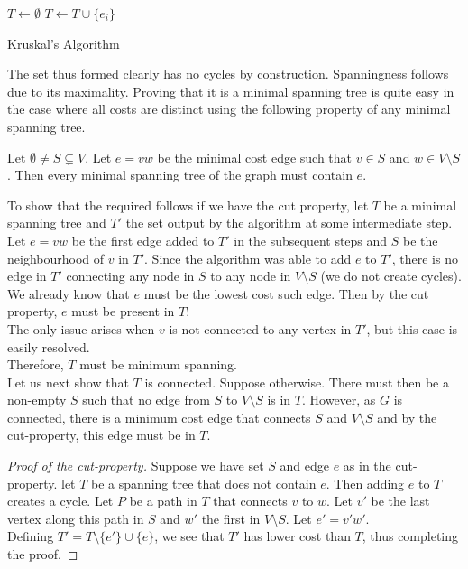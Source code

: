 \begin{algorithm}
	\DontPrintSemicolon
	\SetNoFillComment
	 
	$T\gets\emptyset$\;
	 {
		 {
			$T\gets T\cup\{e_i\}$
		}
	}
	\caption{Kruskal's Algorithm}\label{algo: kruskal's algorithm}
\end{algorithm}

The set thus formed clearly has no cycles by construction. Spanningness follows due to its maximality. Proving that it is a minimal spanning tree is quite easy in the case where all costs are distinct using the following property of any minimal spanning tree.

\begin{lemma}
	Let $\emptyset\neq S\subsetneq V$. Let $e=vw$ be the minimal cost edge such that $v\in S$ and $w\in V\setminus S$. Then every minimal spanning tree of the graph must contain $e$.
\end{lemma}

To show that the required follows if we have the cut property, let $T$ be a minimal spanning tree and $T'$ the set output by the algorithm at some intermediate step.\\
Let $e=vw$ be the first edge added to $T'$ in the subsequent steps and $S$ be the neighbourhood of $v$ in $T'$. Since the algorithm was able to add $e$ to $T'$, there is no edge in $T'$ connecting any node in $S$ to any node in $V\setminus S$ (we do not create cycles). We already know that $e$ must be the lowest cost such edge. Then by the cut property, $e$ must be present in $T$!\\
The only issue arises when $v$ is not connected to any vertex in $T'$, but this case is easily resolved.\\
Therefore, $T$ must be minimum spanning.\\

Let us next show that $T$ is connected. Suppose otherwise. There must then be a non-empty $S$ such that no edge from $S$ to $V\setminus S$ is in $T$. However, as $G$ is connected, there is a minimum cost edge that connects $S$ and $V\setminus S$ and by the cut-property, this edge must be in $T$.

\begin{proof}[Proof of the cut-property]
	Suppose we have set $S$ and edge $e$ as in the cut-property. let $T$ be a spanning tree that does not contain $e$. Then adding $e$ to $T$ creates a cycle. Let $P$ be a path in $T$ that connects $v$ to $w$. Let $v'$ be the last vertex along this path in $S$ and $w'$ the first in $V\setminus S$. Let $e'=v'w'$.\\
	Defining $T' = T\setminus\{e'\}\cup\{e\}$, we see that $T'$ has lower cost than $T$, thus completing the proof. 
\end{proof}

